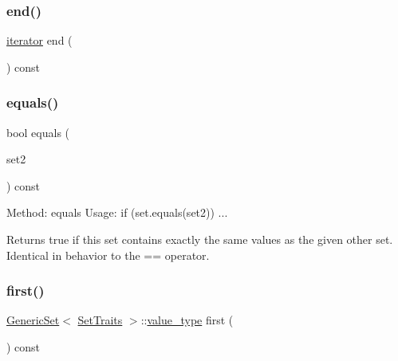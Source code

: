 \subsubsection{\texorpdfstring{end()}{end()}}
{\footnotesize\ttfamily \mbox{\hyperlink{classstanfordcpplib_1_1collections_1_1GenericSet_ab3d10e70baaeac78e76b7abae7e2cf76}{iterator}} end (\begin{DoxyParamCaption}{ }\end{DoxyParamCaption}) const\hspace{0.3cm}{\ttfamily [inline]}}

\mbox{\label{classstanfordcpplib_1_1collections_1_1GenericSet_af0f6c12b7eb171e7b5e3725f04f3c1f3}} 
\subsubsection{\texorpdfstring{equals()}{equals()}}
{\footnotesize\ttfamily bool equals (\begin{DoxyParamCaption}\item[{const \mbox{\hyperlink{classstanfordcpplib_1_1collections_1_1GenericSet}{Generic\+Set}}$<$ \mbox{\hyperlink{structstanfordcpplib_1_1collections_1_1SetTraits}{Set\+Traits}} $>$ \&}]{set2 }\end{DoxyParamCaption}) const}



Method\+: equals Usage\+: if (set.\+equals(set2)) ... 



 Returns {\ttfamily true} if this set contains exactly the same values as the given other set. Identical in behavior to the == operator. \mbox{\label{classstanfordcpplib_1_1collections_1_1GenericSet_a645a432ab2e8069945e37c3adc9a7ff5}} 
\subsubsection{\texorpdfstring{first()}{first()}}
{\footnotesize\ttfamily \mbox{\hyperlink{classstanfordcpplib_1_1collections_1_1GenericSet}{Generic\+Set}}$<$ \mbox{\hyperlink{structstanfordcpplib_1_1collections_1_1SetTraits}{Set\+Traits}} $>$\+::\mbox{\hyperlink{classstanfordcpplib_1_1collections_1_1GenericSet_a669c81f158766925e7293f97c0099b28}{value\+\_\+type}} first (\begin{DoxyParamCaption}{ }\end{DoxyParamCaption}) const}



